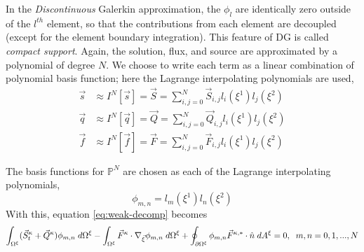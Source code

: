 \documentclass{softwaremanual}
\begin{document}
In the \textit{Discontinuous} Galerkin approximation, the $\phi_l$ are identically zero outside of the $l^{th}$ element, so that the contributions from each element are decoupled (except for the element boundary integration). This feature of DG is called \textit{compact support}. Again, the solution, flux, and source are approximated by a polynomial of degree $N$. We choose to write each term as a linear combination of polynomial basis function; here the Lagrange interpolating polynomials are used,
\begin{subequations}
    \begin{align}
    \vec{s} &\approx I^N[\vec{s}] = \vec{S} =  \sum_{i,j=0}^N \vec{S}_{i,j} l_i(\xi^1) l_j(\xi^2) \\
    \vec{q} &\approx I^N[\vec{q}]= \vec{Q} = \sum_{i,j=0}^N \vec{Q}_{i,j} l_i(\xi^1) l_j(\xi^2) \\
    \vec{f} &\approx I^N[\vec{f}] =\vec{F}= \sum_{i,j=0}^N \vec{F}_{i,j} l_i(\xi^1) l_j(\xi^2)
    \end{align}
 \end{subequations}


The basis functions for $\mathbb{P}^N$ are chosen as each of the Lagrange interpolating polynomials, 
 \begin{equation}
 \phi_{m,n} = l_m(\xi^1) l_n(\xi^2)
 \end{equation}
 With this, equation \eqref{eq:weak-decomp} becomes
   \begin{equation}
  \int_{\Omega^\xi} (\vec{S}^\kappa_t + \vec{Q}^\kappa) \phi_{m,n}  \hspace{1mm} d\Omega^\xi  - \int_{\Omega^\xi} \vec{F}^\kappa \cdot \nabla_{\vec{\xi}} \phi_{m,n}   \hspace{1mm} d\Omega^\xi + \oint_{\partial \Omega^\xi} \phi_{m,n}  \vec{F}^{\kappa,*}  \cdot \hat{n} \hspace{1mm} d A^\xi = 0, \hspace{2mm} m,n=0,1,...,N  \label{eq:weak-decomp-basis}
  \end{equation}
  
\end{document}
